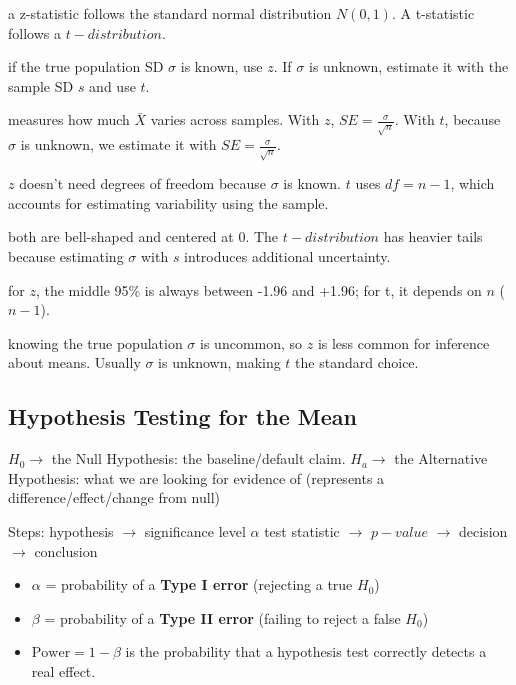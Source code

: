 \documentclass[
  letterpaper,
  DIV=11,
  numbers=noendperiod]{scrreprt}
\providecommand{\tightlist}{%
  \setlength{\itemsep}{0pt}\setlength{\parskip}{0pt}}
\begin{document}
\begin{description}
\tightlist
\item[Distribution]
a z-statistic follows the standard normal distribution \(N(0,1)\). A
t-statistic follows a \(t-distribution\).
\item[Population SD \(\sigma\)]
if the true population SD \(\sigma\) is known, use \(z\). If \(\sigma\)
is unknown, estimate it with the sample SD \(s\) and use \(t\).
\item[Standard error]
measures how much \(\bar{X}\) varies across samples. With \(z\),
\(SE=\frac{\sigma}{\sqrt{n}}\). With \(t\), because \(\sigma\) is
unknown, we estimate it with \(SE=\frac{\sigma}{\sqrt{n}}\).
\item[Degrees of freedom]
\(z\) doesn't need degrees of freedom because \(\sigma\) is known. \(t\)
uses \(df=n-1\), which accounts for estimating variability using the
sample.
\item[Shape]
both are bell-shaped and centered at 0. The \(t-distribution\) has
heavier tails because estimating \(\sigma\) with \(s\) introduces
additional uncertainty.
\item[Critical value for 95\%]
for \(z\), the middle 95\% is always between -1.96 and +1.96; for t, it
depends on \(n\) (\(n-1\)).
\item[Common use for means]
knowing the true population \(\sigma\) is uncommon, so \(z\) is less
common for inference about means. Usually \(\sigma\) is unknown, making
\(t\) the standard choice.
\end{description}

\subsection{Hypothesis Testing for the
Mean}\label{hypothesis-testing-for-the-mean}

\(H_0 \rightarrow\) the Null Hypothesis: the baseline/default claim.
\(H_a \rightarrow\) the Alternative Hypothesis: what we are looking for
evidence of (represents a difference/effect/change from null)

Steps: hypothesis \(\rightarrow\) significance level \(\alpha\) test
statistic \(\rightarrow\) \(p-value\) \(\rightarrow\) decision
\(\rightarrow\) conclusion

\begin{itemize}
\tightlist
\item
  \(\alpha\) = probability of a \textbf{Type I error} (rejecting a true
  \(H_0\))
\item
  \(\beta\) = probability of a \textbf{Type II error} (failing to reject
  a false \(H_0\))
\item
  \(\text{Power} = 1-\beta\) is the probability that a hypothesis test
  correctly detects a real effect.
\end{itemize}
\end{document}
